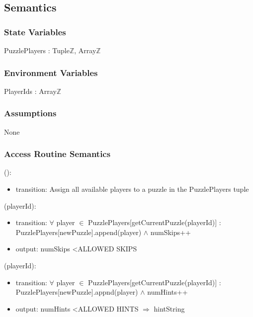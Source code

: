 \documentclass[12pt, titlepage]{article}
\begin{document}
\subsection{Semantics}

\subsubsection{State Variables}

PuzzlePlayers : Tuple\textlangle$\mathds{Z}$, Array\textlangle$\mathds{Z}$\textrangle\textrangle

\subsubsection{Environment Variables}

PlayerIds : Array\textlangle$\mathds{Z}$\textrangle

\subsubsection{Assumptions}

None

\subsubsection{Access Routine Semantics}

():
\begin{itemize}
\item transition: Assign all available players to a puzzle in the PuzzlePlayers tuple
\end{itemize}

(playerId):
\begin{itemize}
\item transition: $\forall$ player $\in$ PuzzlePlayers[getCurrentPuzzle(playerId)] : \newline PuzzlePlayers[newPuzzle].append(player) $\land$ numSkips++
\item output: numSkips \textless ALLOWED SKIPS
\end{itemize}

(playerId):
\begin{itemize}
\item transition: $\forall$ player $\in$ PuzzlePlayers[getCurrentPuzzle(playerId)] : \newline PuzzlePlayers[newPuzzle].appnd(player) $\land$ numHints++
\item output: numHints \textless ALLOWED HINTS $\Rightarrow$ hintString
\end{itemize}
\end{document}
